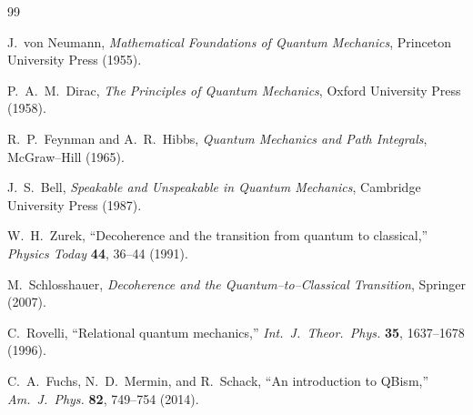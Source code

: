 \documentclass[11pt]{article}
\begin{document}
\begin{thebibliography}{99}

J.~von Neumann,
\textit{Mathematical Foundations of Quantum Mechanics},
Princeton University Press (1955).

P.~A.~M.~Dirac,
\textit{The Principles of Quantum Mechanics},
Oxford University Press (1958).

R.~P.~Feynman and A.~R.~Hibbs,
\textit{Quantum Mechanics and Path Integrals},
McGraw--Hill (1965).

J.~S.~Bell,
\textit{Speakable and Unspeakable in Quantum Mechanics},
Cambridge University Press (1987).

W.~H.~Zurek,
``Decoherence and the transition from quantum to classical,''
\textit{Physics Today} \textbf{44}, 36--44 (1991).

M.~Schlosshauer,
\textit{Decoherence and the Quantum--to--Classical Transition},
Springer (2007).

C.~Rovelli,
``Relational quantum mechanics,''
\textit{Int.\ J.\ Theor.\ Phys.} \textbf{35}, 1637--1678 (1996).

C.~A.~Fuchs, N.~D.~Mermin, and R.~Schack,
``An introduction to QBism,''
\textit{Am.\ J.\ Phys.} \textbf{82}, 749--754 (2014).

\end{thebibliography}
\end{document}
